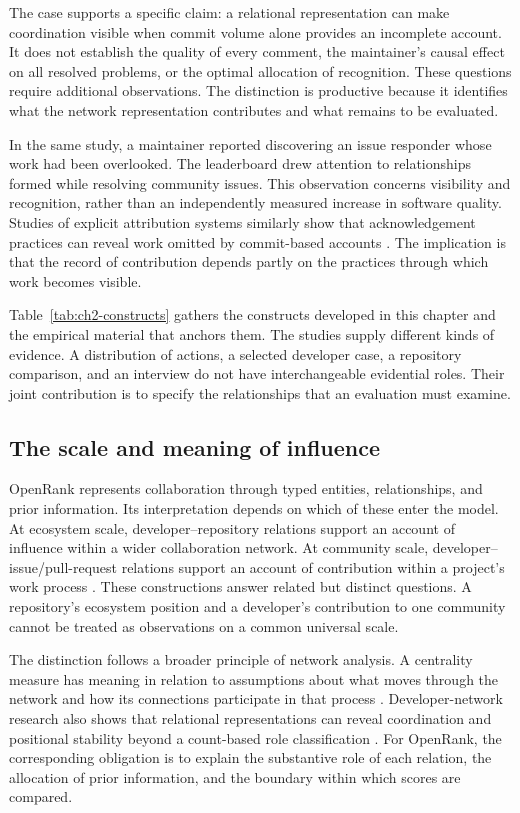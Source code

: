 The case supports a specific claim: a relational representation can make coordination visible when commit volume alone provides an incomplete account. It does not establish the quality of every comment, the maintainer's causal effect on all resolved problems, or the optimal allocation of recognition. These questions require additional observations. The distinction is productive because it identifies what the network representation contributes and what remains to be evaluated.

In the same study, a maintainer reported discovering an issue responder whose work had been overlooked. The leaderboard drew attention to relationships formed while resolving community issues. This observation concerns visibility and recognition, rather than an independently measured increase in software quality. Studies of explicit attribution systems similarly show that acknowledgement practices can reveal work omitted by commit-based accounts \citep{young2021}. The implication is that the record of contribution depends partly on the practices through which work becomes visible.

Table~\ref{tab:ch2-constructs} gathers the constructs developed in this chapter and the empirical material that anchors them. The studies supply different kinds of evidence. A distribution of actions, a selected developer case, a repository comparison, and an interview do not have interchangeable evidential roles. Their joint contribution is to specify the relationships that an evaluation must examine.



\subsection{The scale and meaning of influence}
OpenRank represents collaboration through typed entities, relationships, and prior information. Its interpretation depends on which of these enter the model. At ecosystem scale, developer--repository relations support an account of influence within a wider collaboration network. At community scale, developer--issue/pull-request relations support an account of contribution within a project's work process \citep{han2026rank,zhao2025thesis}. These constructions answer related but distinct questions. A repository's ecosystem position and a developer's contribution to one community cannot be treated as observations on a common universal scale.

The distinction follows a broader principle of network analysis. A centrality measure has meaning in relation to assumptions about what moves through the network and how its connections participate in that process \citep{borgatti2005}. Developer-network research also shows that relational representations can reveal coordination and positional stability beyond a count-based role classification \citep{joblin2017}. For OpenRank, the corresponding obligation is to explain the substantive role of each relation, the allocation of prior information, and the boundary within which scores are compared.

